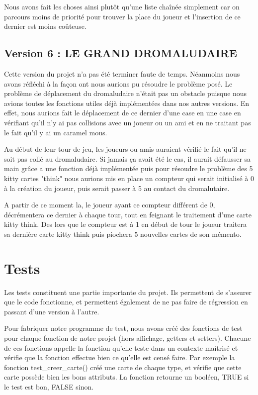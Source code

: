 \documentclass[10pt,a4paper]{article}
\begin{document}
Nous avons fait les choses ainsi plutôt qu'une liste chaînée simplement car on parcours moins de priorité pour trouver la place du joueur et l'insertion de ce dernier est moins coûteuse. 

\newpage
\subsection{Version 6 : LE GRAND DROMALUDAIRE}
Cette version du projet n'a pas été terminer faute de temps. Néanmoins nous avons réfléchi à la façon ont nous aurions pu résoudre le problème posé.
Le problème de déplacement du dromaludaire n’était pas un obstacle puisque nous avions toutes les fonctions utiles déjà implémentées dans nos autres versions.
En effet, nous aurions fait le déplacement de ce dernier d'une case en une case en vérifiant qu'il n'y ai pas collisions avec un joueur ou un ami et en ne traitant pas le fait qu'il y ai un caramel mous. 

Au début de leur tour de jeu, les joueurs ou amis auraient vérifié le fait qu'il ne soit pas collé au dromaludaire. Si jamais ça avait été le cas, il aurait défausser sa main grâce a une fonction déjà implémentée puis pour résoudre le problème des 5 kitty cartes "think" nous aurions mis en place un compteur qui serait initialisé à 0 à la création du joueur, puis serait passer à 5 au contact du dromalutaire.

A partir de ce moment la, le joueur ayant ce compteur différent de 0, décrémentera ce dernier à chaque tour, tout en feignant le traitement d'une carte kitty think. Des lors que le compteur est à 1 en début de tour le joueur traitera sa dernière carte kitty think puis piochera 5 nouvelles cartes de son mémento. 



\newpage
\section{Tests}
Les tests constituent une partie importante du projet. Ils permettent de s'assurer que le code fonctionne, et permettent également de ne pas faire de régression en passant d'une version à l'autre. 

Pour fabriquer notre programme de test, nous avons créé des fonctions de test pour chaque fonction de notre projet (hors affichage, getters et setters). Chacune de ces fonctions appelle la fonction qu'elle teste dans un contexte maîtrisé et vérifie que la fonction effectue bien ce qu'elle est censé faire. Par exemple la fonction test\_creer\_carte() créé une carte de chaque type, et vérifie que cette carte possède bien les bons attributs. La fonction retourne un booléen, TRUE si le test est bon, FALSE sinon. 
\end{document}
